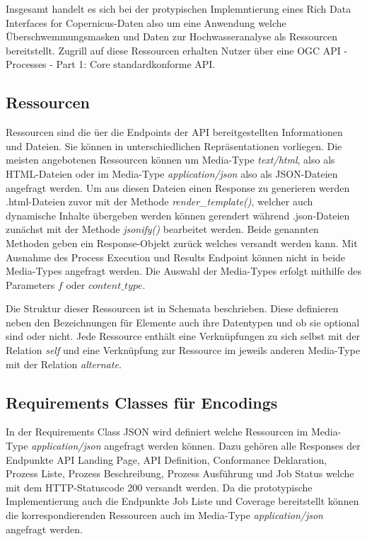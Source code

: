 Insgesamt handelt es sich bei der protypischen Implemntierung eines Rich Data Interfaces for Copernicus-Daten also um eine Anwendung welche Überschwemmungsmasken und Daten zur Hochwasseranalyse als Ressourcen bereitstellt.
Zugrill auf diese Ressourcen erhalten Nutzer über eine OGC API - Processes - Part 1: Core standardkonforme API. 

\subsection{Ressourcen}
Ressourcen sind die üer die Endpoints der API bereitgestellten Informationen und Dateien. Sie können in unterschiedlichen Repräsentationen vorliegen.
Die meisten angebotenen Ressourcen können um Media-Type \textit{text/html}, also als HTML-Dateien oder im Media-Type \textit{application/json} also als 
JSON-Dateien angefragt werden. Um aus diesen Dateien einen Response zu generieren werden .html-Dateien zuvor mit der Methode \textit{render\_template()}, welcher auch 
dynamische Inhalte übergeben werden können gerendert während .json-Dateien zunächst mit der Methode \textit{jsonify()} bearbeitet werden. Beide genannten Methoden
geben ein Response-Objekt zurück welches versandt werden kann. Mit Ausnahme des Process Execution und Results Endpoint können nicht in beide Media-Types angefragt werden.
Die Auswahl der Media-Types erfolgt mithilfe des Parameters $f$ oder $content\_type$. 

Die Struktur dieser Ressourcen ist in Schemata beschrieben. Diese definieren neben den Bezeichnungen für Elemente auch ihre Datentypen und 
ob sie optional sind oder nicht. Jede Ressource enthält eine Verknüpfungen zu sich selbst mit der Relation \textit{self} und eine Verknüpfung 
zur Ressource im jeweils anderen Media-Type mit der Relation \textit{alternate}. 

\subsection{Requirements Classes für Encodings}
In der Requirements Class JSON wird definiert welche Ressourcen im Media-Type \textit{application/json} angefragt werden können. Dazu gehören alle Responses der 
Endpunkte API Landing Page, API Definition, Conformance Deklaration, Prozess Liste, Prozess Beschreibung, Prozess Ausführung und Job Status welche mit dem 
HTTP-Statuscode 200 versandt werden. Da die prototypische Implementierung auch die Endpunkte Job Liste und Coverage bereitstellt können die korrespondierenden
Ressourcen auch im Media-Type \textit{application/json} angefragt werden.\\

